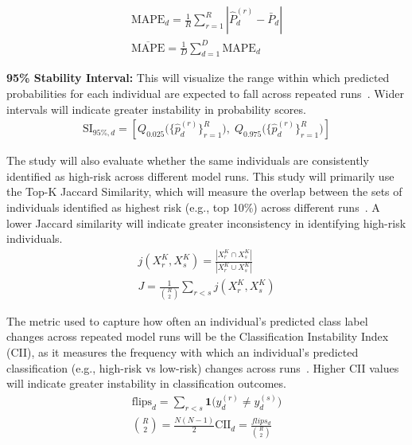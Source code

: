 \documentclass[12pt]{article}
\begin{document}
\begin{align}
  \text{MAPE}_d=\frac{1}{R}\sum_{r=1}^{R}|\hat{P}_{d}^{(r)}-\bar{P}_d| \\
  \overline{\text{MAPE}}=\frac{1}{D}\sum_{d=1}^{D}\text{MAPE}_d
\end{align} 

\textbf{95\% Stability Interval:} This will visualize the range within which predicted probabilities for each individual are expected to fall across repeated runs~\cite{riley2023stability}. Wider intervals will indicate greater instability in probability scores.\\

\begin{align}
  \text{SI}_{95\%,d} =
  \left[
  Q_{0.025}\big(\{\hat{p}_d^{(r)}\}_{r=1}^{R}\big),
  \;
  Q_{0.975}\big(\{\hat{p}_d^{(r)}\}_{r=1}^{R}\big)
  \right]
\end{align}  

The study will also evaluate whether the same individuals are consistently identified as high-risk across different model runs. This study will primarily use the Top-K Jaccard Similarity, which will measure the overlap between the sets of individuals identified as highest risk (e.g., top 10\%) across different runs~\cite{lopez2022instability}. A lower Jaccard similarity will indicate greater inconsistency in identifying high-risk individuals.\\

\begin{align}
  j(X_r^K,X_s^K)=\frac{|X_r^K \cap X_s^K|}{|X_r^K \cup X_s^K|} \\
  J=\frac{1}{\binom{R}{2}}\sum_{r<s}j(X_r^K,X_s^K)
\end{align}

The metric used to capture how often an individual's predicted class label changes across repeated model runs will be the Classification Instability Index (CII), as it measures the frequency with which an individual's predicted classification (e.g., high-risk vs low-risk) changes across runs~\cite{riley2023stability}. Higher CII values will indicate greater instability in classification outcomes.\\

\begin{align}
  \text{flips}_d = \sum_{r<s} \mathbf{1}\big(y_d^{(r)} \ne y_d^{(s)}\big) \\
  \binom{R}{2}=\frac{N(N-1)}{2}
  \text{CII}_d=\frac{flips_d}{\binom{R}{2}} \\
\end{align}
\end{document}
